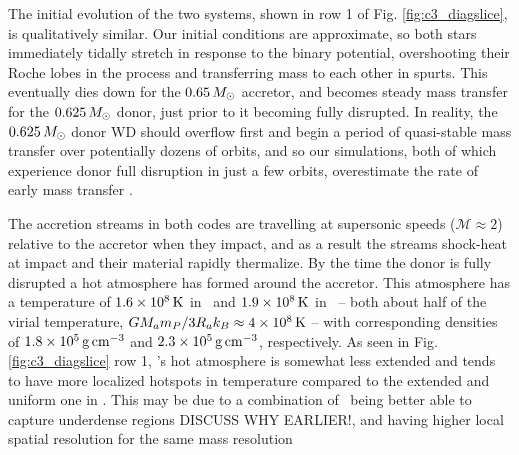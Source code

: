 The initial evolution of the two systems, shown in row 1 of Fig. \ref{fig:c3_diagslice}, is qualitatively similar.  Our initial conditions are approximate, so both stars immediately tidally stretch in response to the binary potential, overshooting their Roche lobes in the process and transferring mass to each other in spurts.  This eventually dies down for the $0.65\,\Msun$ accretor, and becomes steady mass transfer for the $0.625\,\Msun$ donor, just prior to it becoming fully disrupted.  In reality, the $0.625\,\Msun$ donor WD should overflow first and begin a period of quasi-stable mass transfer over potentially dozens of orbits, and so our simulations, both of which experience donor full disruption in just a few orbits, overestimate the rate of early mass transfer \citep{dan+11}.


The accretion streams in both codes are travelling at supersonic speeds ($\mathcal{M} \approx 2$) relative to the accretor when they impact, and as a result the streams shock-heat at impact and their material rapidly thermalize.  By the time the donor is fully disrupted a hot atmosphere has formed around the accretor.  This atmosphere has a temperature of $1.6 \times 10^8\,\mathrm{K}$ in  \arepo\ and $1.9\times 10^8\,\mathrm{K}$ in \gasoline\ -- both about half of the virial temperature, $GM_am_P/3R_ak_B \approx 4 \times 10^8\,\mathrm{K}$ -- with corresponding densities of $1.8\times10^5\,\gcc$ and $2.3\times10^5\,\gcc$, respectively.  As seen in Fig. \ref{fig:c3_diagslice} row 1, \arepo's hot atmosphere is somewhat less extended and tends to have more localized hotspots in temperature compared to the  extended and uniform one in \gasoline.  This may be due to a combination of \arepo\ being better able to capture underdense regions {\charles DISCUSS WHY EARLIER!}, and having higher local spatial resolution for the same mass resolution



